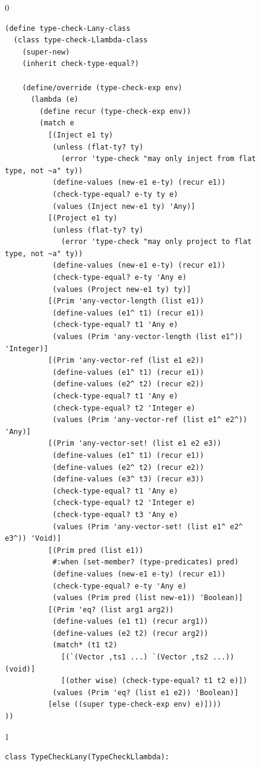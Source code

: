\documentclass[7x10]{TimesAPriori_MIT}%
\def\racketEd{0}
\def\pythonEd{1}
\def\edition{0}
\numberwithin{theorem}{chapter}
\numberwithin{definition}{chapter}
\numberwithin{equation}{chapter}
\begin{document}
\begin{figure}[btp]
  \begin{tcolorbox}[colback=white]
    {\if\edition\racketEd
\begin{lstlisting}[basicstyle=\ttfamily\footnotesize]
(define type-check-Lany-class
  (class type-check-Llambda-class
    (super-new)
    (inherit check-type-equal?)

    (define/override (type-check-exp env)
      (lambda (e)
        (define recur (type-check-exp env))
        (match e
          [(Inject e1 ty)
           (unless (flat-ty? ty)
             (error 'type-check "may only inject from flat type, not ~a" ty))
           (define-values (new-e1 e-ty) (recur e1))
           (check-type-equal? e-ty ty e)
           (values (Inject new-e1 ty) 'Any)]
          [(Project e1 ty)
           (unless (flat-ty? ty)
             (error 'type-check "may only project to flat type, not ~a" ty))
           (define-values (new-e1 e-ty) (recur e1))
           (check-type-equal? e-ty 'Any e)
           (values (Project new-e1 ty) ty)]
          [(Prim 'any-vector-length (list e1))
           (define-values (e1^ t1) (recur e1))
           (check-type-equal? t1 'Any e)
           (values (Prim 'any-vector-length (list e1^)) 'Integer)]
          [(Prim 'any-vector-ref (list e1 e2))
           (define-values (e1^ t1) (recur e1))
           (define-values (e2^ t2) (recur e2))
           (check-type-equal? t1 'Any e)
           (check-type-equal? t2 'Integer e)
           (values (Prim 'any-vector-ref (list e1^ e2^)) 'Any)]
          [(Prim 'any-vector-set! (list e1 e2 e3))
           (define-values (e1^ t1) (recur e1))
           (define-values (e2^ t2) (recur e2))
           (define-values (e3^ t3) (recur e3))
           (check-type-equal? t1 'Any e)
           (check-type-equal? t2 'Integer e)
           (check-type-equal? t3 'Any e)
           (values (Prim 'any-vector-set! (list e1^ e2^ e3^)) 'Void)]
          [(Prim pred (list e1))
           #:when (set-member? (type-predicates) pred)
           (define-values (new-e1 e-ty) (recur e1))
           (check-type-equal? e-ty 'Any e)
           (values (Prim pred (list new-e1)) 'Boolean)]
          [(Prim 'eq? (list arg1 arg2))
           (define-values (e1 t1) (recur arg1))
           (define-values (e2 t2) (recur arg2))
           (match* (t1 t2)
             [(`(Vector ,ts1 ...) `(Vector ,ts2 ...))   (void)]
             [(other wise) (check-type-equal? t1 t2 e)])
           (values (Prim 'eq? (list e1 e2)) 'Boolean)]
          [else ((super type-check-exp env) e)])))
))
\end{lstlisting}
\fi}
{\if\edition\pythonEd
\begin{lstlisting}
class TypeCheckLany(TypeCheckLlambda):


\end{lstlisting}}
\end{tcolorbox}
\end{figure}
\end{document}
